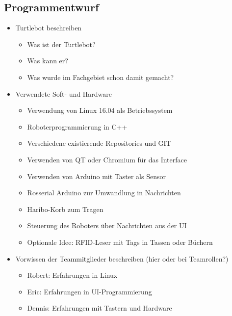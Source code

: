 \documentclass[a4paper,12pt,headsepline,toc=flat]{scrartcl}
\begin{document}
	\subsection{Programmentwurf}
		\begin{itemize}
			\item Turtlebot beschreiben
			\begin{itemize}
				\item Was ist der Turtlebot?
				\item Was kann er?
				\item Was wurde im Fachgebiet schon damit gemacht?
			\end{itemize}
			
			\item Verwendete Soft- und Hardware
			\begin{itemize}
				\item Verwendung von Linux 16.04 als Betriebssystem
				\item Roboterprogrammierung in C++
				\item Verschiedene existierende Repositories und GIT
				\item Verwenden von QT oder Chromium für das Interface
				\item Verwenden von Arduino mit Taster als Sensor
				\item Rosserial Arduino zur Umwandlung in Nachrichten
				\item Haribo-Korb zum Tragen
				\item Steuerung des Roboters über Nachrichten aus der UI
				\item Optionale Idee: RFID-Leser mit Tags in Tassen oder Büchern
			\end{itemize}
			
			\item Vorwissen der Teammitglieder beschreiben (hier oder bei Teamrollen?)
			\begin{itemize}
				\item Robert: Erfahrungen in Linux
				\item Eric: Erfahrungen in UI-Programmierung
				\item Dennis: Erfahrungen mit Tastern und Hardware
			\end{itemize}
		\end{itemize}
\end{document}
